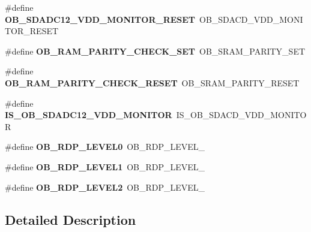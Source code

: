 \begin{DoxyCompactItemize}
\item 
\mbox{\label{group___h_a_l___f_l_a_s_h___aliased___defines_ga330d35b134c5a576318103b718559b11}} 
\#define {\bfseries O\+B\+\_\+\+S\+D\+A\+D\+C12\+\_\+\+V\+D\+D\+\_\+\+M\+O\+N\+I\+T\+O\+R\+\_\+\+R\+E\+S\+ET}~O\+B\+\_\+\+S\+D\+A\+C\+D\+\_\+\+V\+D\+D\+\_\+\+M\+O\+N\+I\+T\+O\+R\+\_\+\+R\+E\+S\+ET
\item 
\mbox{\label{group___h_a_l___f_l_a_s_h___aliased___defines_ga98952cd374b07146bb79583fd61ef6e6}} 
\#define {\bfseries O\+B\+\_\+\+R\+A\+M\+\_\+\+P\+A\+R\+I\+T\+Y\+\_\+\+C\+H\+E\+C\+K\+\_\+\+S\+ET}~O\+B\+\_\+\+S\+R\+A\+M\+\_\+\+P\+A\+R\+I\+T\+Y\+\_\+\+S\+ET
\item 
\mbox{\label{group___h_a_l___f_l_a_s_h___aliased___defines_gab425a7c5a822ef819107a93463361bd9}} 
\#define {\bfseries O\+B\+\_\+\+R\+A\+M\+\_\+\+P\+A\+R\+I\+T\+Y\+\_\+\+C\+H\+E\+C\+K\+\_\+\+R\+E\+S\+ET}~O\+B\+\_\+\+S\+R\+A\+M\+\_\+\+P\+A\+R\+I\+T\+Y\+\_\+\+R\+E\+S\+ET
\item 
\mbox{\label{group___h_a_l___f_l_a_s_h___aliased___defines_gafc1560626d243a2c9fbd72dbb65c8941}} 
\#define {\bfseries I\+S\+\_\+\+O\+B\+\_\+\+S\+D\+A\+D\+C12\+\_\+\+V\+D\+D\+\_\+\+M\+O\+N\+I\+T\+OR}~I\+S\+\_\+\+O\+B\+\_\+\+S\+D\+A\+C\+D\+\_\+\+V\+D\+D\+\_\+\+M\+O\+N\+I\+T\+OR
\item 
\mbox{\label{group___h_a_l___f_l_a_s_h___aliased___defines_ga7339a05119a474a7bde67e9e500d38cb}} 
\#define {\bfseries O\+B\+\_\+\+R\+D\+P\+\_\+\+L\+E\+V\+E\+L0}~O\+B\+\_\+\+R\+D\+P\+\_\+\+L\+E\+V\+E\+L\+\_
\item 
\mbox{\label{group___h_a_l___f_l_a_s_h___aliased___defines_ga7291ec039ae68ee1471af8ef3310d326}} 
\#define {\bfseries O\+B\+\_\+\+R\+D\+P\+\_\+\+L\+E\+V\+E\+L1}~O\+B\+\_\+\+R\+D\+P\+\_\+\+L\+E\+V\+E\+L\+\_
\item 
\mbox{\label{group___h_a_l___f_l_a_s_h___aliased___defines_gae591fa55ccad5cc27b322a5fba9d6ca1}} 
\#define {\bfseries O\+B\+\_\+\+R\+D\+P\+\_\+\+L\+E\+V\+E\+L2}~O\+B\+\_\+\+R\+D\+P\+\_\+\+L\+E\+V\+E\+L\+\_
\end{DoxyCompactItemize}


\subsection{Detailed Description}
